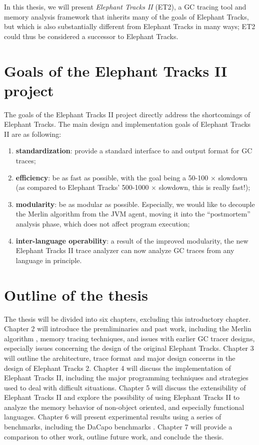 In this thesis, we will present \emph{Elephant Tracks II} (ET2), a GC tracing tool and memory analysis framework that inherits many of
the goals of Elephant Tracks, but which is also substantially different from Elephant Tracks in many ways; ET2 could thus be considered
a successor to Elephant Tracks. 


\section{Goals of the Elephant Tracks II project}
The goals of the Elephant Tracks II project directly address the shortcomings of Elephant Tracks. The main design and implementation
goals of Elephant Tracks II are as following:

\begin{enumerate}
\item \textbf{standardization}: provide a standard interface to and output format for GC traces;
\item \textbf{efficiency}: be as fast as possible, with the goal being a 50-100 $\times$ slowdown (as compared to
  Elephant Tracks' 500-1000 $\times$ slowdown, this is really fast!);
\item \textbf{modularity}: be as modular as possible. Especially, we would like to decouple the Merlin algorithm from the
  JVM agent, moving it into the ``postmortem'' analysis phase, which does not affect program execution;
\item \textbf{inter-language operability}: a result of the improved modularity, the new Elephant Tracks II trace analyzer can
  now analyze GC traces from any language in principle.
\end{enumerate}


\section{Outline of the thesis}
The thesis will be divided into six chapters, excluding this introductory chapter. Chapter 2 will introduce the premliminaries and
past work, including the Merlin algorithm \citep{Merlin}, memory tracing techniques, and issues with earlier GC tracer designs,
especially issues concerning the design of the original Elephant Tracks. Chapter 3 will outline the architecture, trace format and
major design concerns in the design of Elephant Tracks 2. Chapter 4 will discuss the implementation of Elephant Tracks II, including
the major programming techniques and strategies used to deal with difficult situations. Chapter 5 will discuss the extensibility of
Elephant Tracks II and explore the possibility of using Elephant Tracks II to analyze the memory behavior of non-object oriented,
and especially functional languages. Chapter 6 will present experimental results using a series of benchmarks, including the DaCapo
benchmarks \citep{DaCapo}. Chapter 7 will provide a comparison to other work, outline future work, and conclude the thesis.
